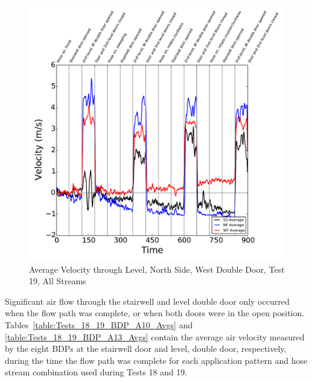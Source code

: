 \documentclass[12pt,oneside]{book}
\begin{document}
\begin{figure}[!ht]
\includegraphics[width=6in]{../../../Figures/Hose_Test_Figures/Test_19_West_063014_BDP_A13_Avg}
\caption{Average Velocity through  Level, North Side, West Double Door, Test 19, All Streams}
\label{fig:Test_19_BDP_A13_Avg_All}
\end{figure}

\clearpage

Significant air flow through the stairwell and  level double door only occurred when the flow path was complete, or when both doors were in the open position. Tables~\ref{table:Tests_18_19_BDP_A10_Avgs} and \ref{table:Tests_18_19_BDP_A13_Avgs} contain the average air velocity measured by the eight BDPs at the stairwell door and  level, double door, respectively, during the time the flow path was complete for each application pattern and hose stream combination used during Tests 18 and 19.
\end{document}
